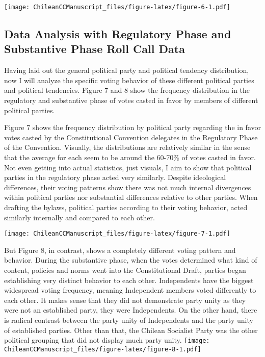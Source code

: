 \documentclass[
]{article}
\begin{document}
\texttt{[image: ChileanCCManuscript\_files/figure-latex/figure-6-1.pdf]}

\hypertarget{data-analysis-with-regulatory-phase-and-substantive-phase-roll-call-data}{%
\subsection{Data Analysis with Regulatory Phase and Substantive Phase
Roll Call
Data}\label{data-analysis-with-regulatory-phase-and-substantive-phase-roll-call-data}}

Having laid out the general political party and political tendency
distribution, now I will analyze the specific voting behavior of these
different political parties and political tendencies. Figure 7 and 8
show the frequency distribution in the regulatory and substantive phase
of votes casted in favor by members of different political parties.

Figure 7 shows the frequency distribution by political party regarding
the in favor votes casted by the Constitutional Convention delegates in
the Regulatory Phase of the Convention. Visually, the distributions are
relatively similar in the sense that the average for each seem to be
around the 60-70\% of votes casted in favor. Not even getting into
actual statistics, just visuals, I aim to show that political parties in
the regulatory phase acted very similarly. Despite ideological
differences, their voting patterns show there was not much internal
divergences within political parties nor substantial differences
relative to other parties. When drafting the bylaws, political parties
according to their voting behavior, acted similarly internally and
compared to each other.

\texttt{[image: ChileanCCManuscript\_files/figure-latex/figure-7-1.pdf]}

But Figure 8, in contrast, shows a completely different voting pattern
and behavior. During the substantive phase, when the votes determined
what kind of content, policies and norms went into the Constitutional
Draft, parties began establishing very distinct behavior to each other.
Independents have the biggest widespread voting frequency, meaning
Independent members voted differently to each other. It makes sense that
they did not demonstrate party unity as they were not an established
party, they were Independents. On the other hand, there is radical
contrast between the party unity of Independents and the party unity of
established parties. Other than that, the Chilean Socialist Party was
the other political grouping that did not display much party unity.
\texttt{[image: ChileanCCManuscript\_files/figure-latex/figure-8-1.pdf]}
\end{document}
